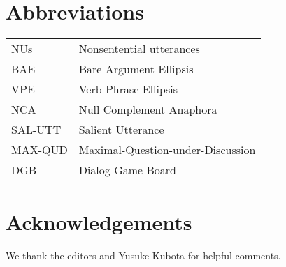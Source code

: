 \documentclass[output=paper
                ,modfonts
                ,nonflat
	        ,collection
	        ,collectionchapter
	        ,collectiontoclongg
 	        ,biblatex
                ,babelshorthands
                ,newtxmath
                ,draftmode
                ,colorlinks, citecolor=brown
]{./langsci/langscibook}
\begin{document}
{%








\section*{Abbreviations}

\begin{tabularx}{.99\textwidth}{@{}lX}
NUs & Nonsentential utterances\\
BAE & Bare Argument Ellipsis\\
VPE & Verb Phrase Ellipsis\\
NCA & Null Complement Anaphora\\
SAL-UTT & Salient Utterance\\
MAX-QUD & Maximal-Question-under-Discussion\\
DGB & Dialog Game Board\\
\end{tabularx}


\section*{Acknowledgements}
We thank the editors and Yusuke Kubota for helpful comments.

{\sloppy
\printbibliography[heading=subbibliography,notkeyword=this]
}

}%
\end{document}
